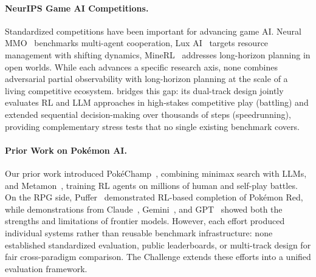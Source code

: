 \paragraph{NeurIPS Game AI Competitions.}
Standardized competitions have been important for advancing game AI. Neural MMO~\citep{liu2023neurips, suarez2023neural} benchmarks multi-agent cooperation, Lux AI~\citep{tao2024lux} targets resource management with shifting dynamics, MineRL~\citep{guss2019minerl, milani2023solvingfuzzytaskshuman, shah2022retrospective} addresses long-horizon planning in open worlds. While each advances a specific research axis, none combines adversarial partial observability with long-horizon planning at the scale of a living competitive ecosystem. \pokeagent bridges this gap: its dual-track design jointly evaluates RL and LLM approaches in high-stakes competitive play (battling) and extended sequential decision-making over thousands of steps (speedrunning), providing complementary stress tests that no single existing benchmark covers.

\paragraph{Prior Work on Pokémon AI.}
Our prior work introduced PokéChamp~\citep{karten2025pok}, combining minimax search with LLMs, and Metamon~\citep{grigsby2025human}, training RL agents on millions of human and self-play battles. On the RPG side, Puffer~\citep{pleines2025pokemon} demonstrated RL-based completion of Pokémon Red, while demonstrations from Claude~\citep{engadget2025claudeplayspokemon,anthropic2025visible}, Gemini~\citep{gemini2p5report,zhang2025geminiplayspokemon, zhang2025gemini3playspokemon}, and GPT~\citep{engadget2025gptplayspokemon} showed both the strengths and limitations of frontier models. However, each effort produced individual systems rather than reusable benchmark infrastructure: none established standardized evaluation, public leaderboards, or multi-track design for fair cross-paradigm comparison. The \pokeagent Challenge extends these efforts into a unified evaluation framework.
